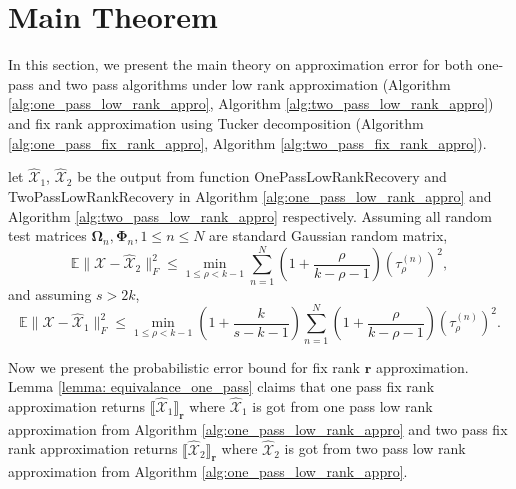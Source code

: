 \section{Main Theorem}
In this section, we present the main theory on approximation error for both one-pass and two pass algorithms under low rank approximation (Algorithm \ref{alg:one_pass_low_rank_appro}, Algorithm \ref{alg:two_pass_low_rank_appro}) and fix rank approximation using Tucker decomposition (Algorithm \ref{alg:one_pass_fix_rank_appro}, Algorithm \ref{alg:two_pass_fix_rank_appro}). 
\begin{thm}
\label{thm: low_rank_err}
let  $\hat{\mathscr{X}}_1$, $\hat{\mathscr{X}}_2$ be the output from function OnePassLowRankRecovery and TwoPassLowRankRecovery in Algorithm \ref{alg:one_pass_low_rank_appro} and Algorithm \ref{alg:two_pass_low_rank_appro} respectively. Assuming all random test matrices $\mathbf{\Omega}_n, \mathbf{\Phi}_n, 1\le n\le N$ are standard Gaussian random matrix, 
\begin{equation}
\mathbb{E}\| \mathscr{X} - \hat{\mathscr{X}}_2 \|_F^2 \leq  \min_{1\le \rho<k-1}\sum_{n=1}^N \left(1+\frac{\rho}{k-\rho-1}\right)(\tau^{(n)}_\rho)^2, 
\end{equation}
and assuming $s>2k$, 
\begin{equation}
\mathbb{E}\| \mathscr{X} - \hat{\mathscr{X}}_1 \|_F^2  \le    \min_{1\le \rho<k-1}\left(1+\frac{k}{s-k-1}\right) \sum_{n=1}^N \left(1+\frac{\rho}{k-\rho-1}\right)(\tau^{(n)}_\rho)^2. 
\end{equation}
\end{thm}
Now we present the probabilistic error bound for fix rank $\mathbf{r}$ approximation. Lemma \ref{lemma: equivalance_one_pass} claims that one pass fix rank approximation returns $\llbracket \hat{\mathscr{X}}_1 \rrbracket_{\mathbf{r}}$ where $\hat{\mathscr{X}}_1$ is got from one pass low rank approximation from Algorithm \ref{alg:one_pass_low_rank_appro} and two pass fix rank approximation returns $\llbracket \hat{\mathscr{X}}_2 \rrbracket_{\mathbf{r}}$ where $\hat{\mathscr{X}}_2$ is got from two pass low rank approximation from Algorithm \ref{alg:one_pass_low_rank_appro}.
